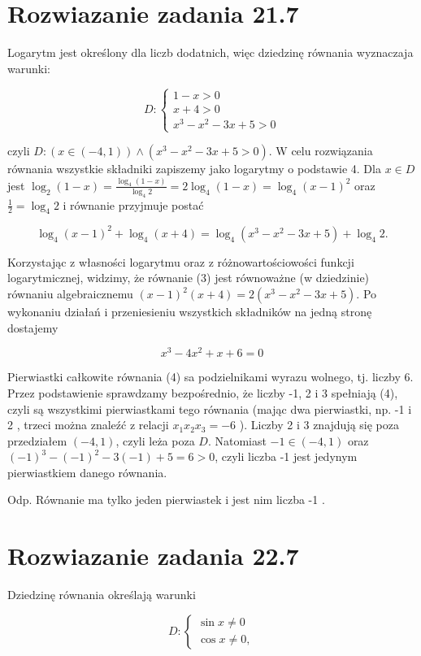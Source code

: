 \documentclass[10pt]{article}
\begin{document}
\section*{Rozwiazanie zadania 21.7}
Logarytm jest określony dla liczb dodatnich, więc dziedzinę równania wyznaczaja warunki:

$$
D:\left\{\begin{array}{l}
1-x>0 \\
x+4>0 \\
x^{3}-x^{2}-3 x+5>0
\end{array}\right.
$$

czyli $D:(x \in(-4,1)) \wedge\left(x^{3}-x^{2}-3 x+5>0\right)$. W celu rozwiązania równania wszystkie składniki zapiszemy jako logarytmy o podstawie 4. Dla $x \in D$ jest $\log _{2}(1-x)=\frac{\log _{4}(1-x)}{\log _{4} 2}=2 \log _{4}(1-x)=\log _{4}(x-1)^{2}$ oraz $\frac{1}{2}=\log _{4} 2$ i równanie przyjmuje postać

$$
\log _{4}(x-1)^{2}+\log _{4}(x+4)=\log _{4}\left(x^{3}-x^{2}-3 x+5\right)+\log _{4} 2 .
$$

Korzystając z własności logarytmu oraz z różnowartościowości funkcji logarytmicznej, widzimy, że równanie (3) jest równoważne (w dziedzinie) równaniu algebraicznemu $(x-1)^{2}(x+4)=2\left(x^{3}-x^{2}-3 x+5\right)$. Po wykonaniu działań i przeniesieniu wszystkich składników na jedną stronę dostajemy

$$
x^{3}-4 x^{2}+x+6=0
$$

Pierwiastki całkowite równania (4) sa podzielnikami wyrazu wolnego, tj. liczby 6. Przez podstawienie sprawdzamy bezpośrednio, że liczby -1, 2 i 3 spełniają (4), czyli są wszystkimi pierwiastkami tego równania (mając dwa pierwiastki, np. -1 i 2 , trzeci można znaleźć z relacji $x_{1} x_{2} x_{3}=-6$ ). Liczby 2 i 3 znajdują się poza przedziałem $(-4,1)$, czyli leża poza $D$. Natomiast $-1 \in(-4,1)$ oraz $(-1)^{3}-(-1)^{2}-3(-1)+5=6>0$, czyli liczba -1 jest jedynym pierwiastkiem danego równania.

Odp. Równanie ma tylko jeden pierwiastek i jest nim liczba -1 .

\section*{Rozwiazanie zadania 22.7}
Dziedzinę równania określają warunki

$$
D:\left\{\begin{array}{l}
\sin x \neq 0 \\
\cos x \neq 0,
\end{array}\right.
$$
\end{document}
